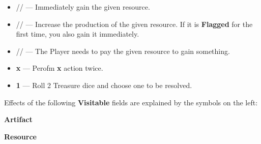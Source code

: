\begin{multicols*}{2}
\begin{itemize}[itemsep=1em]
  \item [{\LARGE\textbf{+}}]
    // —
    Immediately gain the given resource.
  \item [{}]
    // —
    Increase the production of the given resource.
    If it is \textbf{Flagged} for the first time, you also gain it immediately.
  \item [{}]
    //  —
    The Player needs to pay the given resource to gain something.
  \item [{\LARGE\textbf{2}}] {\LARGE\textbf{x}} —
    Perofm {\LARGE\textbf{x}} action twice.
  \item [{\LARGE\textbf{2}}]  {\LARGE\textbf{1}} —
    Roll 2 Treasure dice and choose one to be resolved.
\end{itemize}

\phantom{}
\vspace*{\fill}
\columnbreak

Effects of the following \textbf{Visitable} fields are explained by the symbols on the left:

\medskip

{\centering
  \phantom{j}\textbf{Artifact}\\

  \bigskip

  \phantom{j}\textbf{Resource}\\
  \\

  \bigskip

}
\end{multicols*}
